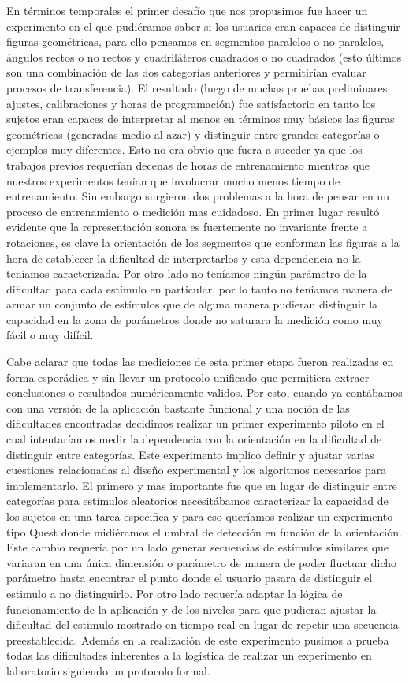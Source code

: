 \documentclass{article}
\begin{document}
    En términos temporales el primer desafío que nos propusimos fue hacer un experimento en el que pudiéramos saber si los usuarios eran capaces de distinguir figuras geométricas, para ello pensamos en segmentos paralelos o no paralelos, ángulos rectos o no rectos y cuadriláteros cuadrados o no cuadrados (esto últimos son una combinación de las dos categorías anteriores y permitirían evaluar procesos de transferencia). El resultado (luego de muchas pruebas preliminares, ajustes, calibraciones y horas de programación) fue satisfactorio en tanto los sujetos eran capaces de interpretar al menos en términos muy básicos las figuras geométricas (generadas medio al azar) y distinguir entre grandes categorías o ejemplos muy diferentes. Esto no era obvio que fuera a suceder ya que los trabajos previos requerían decenas de horas de entrenamiento mientras que nuestros experimentos tenían que involucrar mucho menos tiempo de entrenamiento. Sin embargo surgieron dos problemas a la hora de pensar en un proceso de entrenamiento o medición mas cuidadoso. En primer lugar resultó evidente que la representación sonora es fuertemente no invariante frente a rotaciones, es clave la orientación de los segmentos que conforman las figuras a la hora de establecer la dificultad de interpretarlos y esta dependencia no la teníamos caracterizada. Por otro lado no teníamos ningún parámetro de la dificultad para cada estímulo en particular, por lo tanto no teníamos manera de armar un conjunto de estímulos que de alguna manera pudieran distinguir la capacidad en la zona de parámetros donde no saturara la medición como muy fácil o muy difícil. 
    
    Cabe aclarar que todas las mediciones de esta primer etapa fueron realizadas en forma esporádica y sin llevar un protocolo unificado que permitiera extraer conclusiones o resultados numéricamente validos. Por esto, cuando ya contábamos con una versión de la aplicación bastante funcional y una noción de las dificultades encontradas decidimos realizar un primer experimento piloto en el cual intentaríamos medir la dependencia con la orientación en la dificultad de distinguir entre categorías. Este experimento implico definir y ajustar varias cuestiones relacionadas al diseño experimental y los algoritmos necesarios para implementarlo. El primero y mas importante fue que en lugar de distinguir entre categorías para estímulos aleatorios necesitábamos caracterizar la capacidad de los sujetos en una tarea especifica y para eso queríamos realizar un experimento tipo Quest donde midiéramos el umbral de detección en función de la orientación. Este cambio requería por un lado generar secuencias de estímulos similares que variaran en una única dimensión o parámetro de manera de poder fluctuar dicho parámetro hasta encontrar el punto donde el usuario pasara de distinguir el estimulo a no distinguirlo. Por otro lado requería adaptar la lógica de funcionamiento de la aplicación y de los niveles para que pudieran ajustar la dificultad del estimulo mostrado en tiempo real en lugar de repetir una secuencia preestablecida. Además en la realización de este experimento pusimos a prueba todas las dificultades inherentes a la logística de realizar un experimento en laboratorio siguiendo un protocolo formal.
    
\end{document}
